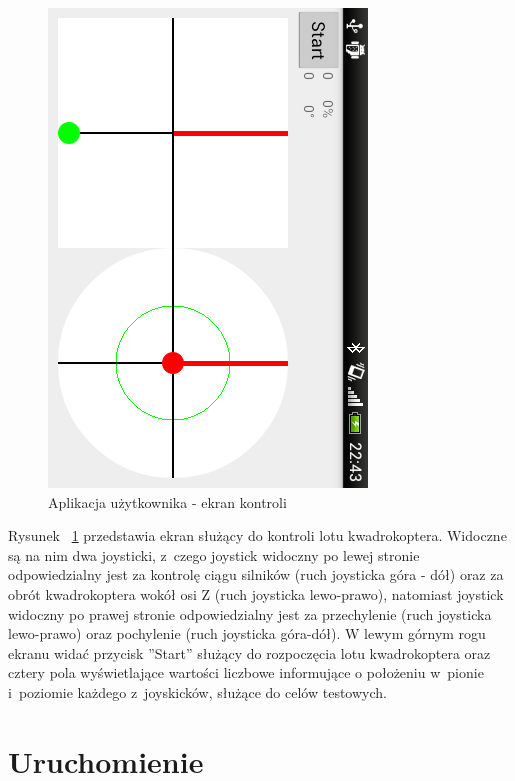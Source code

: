 \documentclass[11pt, twoside]{Thesis} %
\begin{document}
\begin{figure}[H]
	\centering
	\includegraphics[scale=0.6, angle=90]{Pictures/DroidAtScreen/droid@screen-4.png}
	\caption[Aplikacja użytkownika - ekran kontroli]{Aplikacja użytkownika - ekran kontroli}
	\label{fig:QuadroControl_screen4}
\end{figure}

Rysunek ~\ref{fig:QuadroControl_screen4} przedstawia ekran służący do kontroli lotu kwadrokoptera. Widoczne są na nim dwa joysticki, z~czego joystick widoczny po lewej stronie odpowiedzialny jest za kontrolę ciągu silników (ruch joysticka góra - dół) oraz za obrót kwadrokoptera wokół osi Z (ruch joysticka lewo-prawo), natomiast joystick widoczny po prawej stronie odpowiedzialny jest za przechylenie (ruch joysticka lewo-prawo) oraz pochylenie (ruch joysticka góra-dół). W lewym górnym rogu ekranu widać przycisk ''Start'' służący do rozpoczęcia lotu kwadrokoptera oraz cztery pola wyświetlające wartości liczbowe informujące o położeniu w~pionie i~poziomie każdego z~joyskicków, służące do celów testowych.


% 

\chapter{Uruchomienie} %
\end{document}
